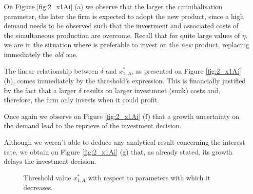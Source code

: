 On Figure \ref{fig:2_x1Ai} (a) we observe that the larger the cannibalisation parameter, the later the firm is expected to adopt the new product, since a high demand needs to be observed such that the investment and associated costs of the simultaneous production are overcome. Recall that for quite large values of $\eta$, we are in the situation where is preferable to invest on the \textit{new} product, replacing immediately the \textit{old} one.

The linear relationship between $\delta$ and $x_{1,A}^*$, as presented on Figure \ref{fig:2_x1Ai} (b), comes immediately  by the threshold's expression. This is financially justified by the fact that a larger $\delta$ results on larger investmnet (sunk) costs and, therefore, the firm only invests when it could profit. 






Once again we observe on Figure \ref{fig:2_x1Ai} (f) that a growth uncertainty on the demand lead to the reprieve of the investment decision. 

Although we weren't able to deduce any analytical result concerning the interest rate, we obtain on Figure \ref{fig:2_x1Ai} (g) that, as already stated, its growth delays the investment decision.


\begin{figure}[!htb]
	\begin{subfigmatrix}{2}
	\end{subfigmatrix}
	\caption{Threshold value $x^*_{1,A}$ with respect to parameters with which it decreases.}
	\label{fig:2_x1Ad}
\end{figure}

